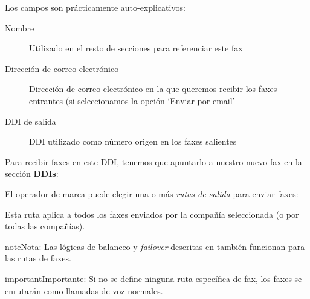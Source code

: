 \documentclass[letterpaper,10pt,spanish]{sphinxmanual}
\begin{document}

Los campos son prácticamente auto-explicativos:
\begin{description}
\item[{Nombre}] \leavevmode{}\label{faxing/index:term-name}
Utilizado en el resto de secciones para referenciar este fax

\item[{Dirección de correo electrónico}] \leavevmode{}\label{faxing/index:term-email}
Dirección de correo electrónico en la que queremos recibir los faxes entrantes (si seleccionamos la opción `Enviar por email'

\item[{DDI de salida}] \leavevmode{}\label{faxing/index:term-outbound-ddi}
DDI utilizado como número origen en los faxes salientes

\end{description}

Para recibir faxes en este DDI, tenemos que apuntarlo a nuestro nuevo fax en la sección \textbf{DDIs}:


El operador de marca puede elegir una o más \emph{rutas de salida} para enviar faxes:


Esta ruta aplica a todos los faxes enviados por la compañía seleccionada (o por todas las compañías).

\begin{notice}{note}{Nota:}
Las lógicas de balanceo y \emph{failover} descritas en {\hyperref[external_outgoing_calls/call_routing:routes\string-metrics]{}} también funcionan para las rutas de faxes.
\end{notice}

\begin{notice}{important}{Importante:}
Si no se define ninguna ruta específica de fax, los faxes se enrutarán como llamadas de voz normales.
\end{notice}
\end{document}

